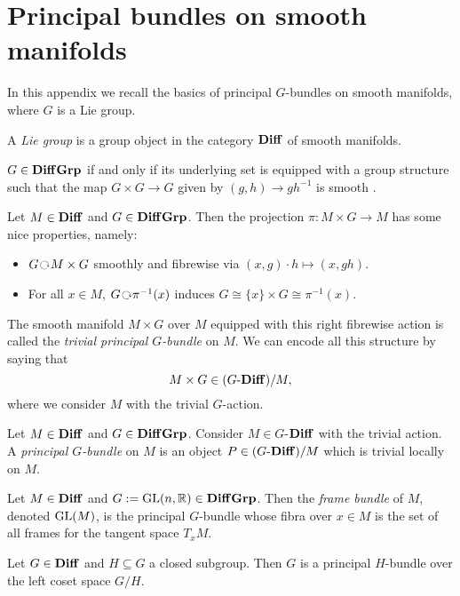 \section{Principal bundles on smooth manifolds}

In this appendix we recall the basics of principal $G$-bundles on smooth manifolds, where $G$ is a Lie group.

\begin{defn}
    A \textit{Lie group} is a group object in the category $\mathbf{Diff}$ of smooth manifolds.
\end{defn}

\begin{rem}
    $G\in \mathbf{Diff}\mathbf{Grp}$ if and only if its underlying set is equipped with a group structure such that the map $G\times G\to G$ given by $(g,h)\to gh^{-1}$ is smooth \cite[Proposition 7.1]{lee13}.
\end{rem}

Let $M\in \mathbf{Diff}$ and $G\in \mathbf{Diff}\mathbf{Grp}$.
Then the projection $\pi\colon M\times G\to M$ has some nice properties, namely:
\begin{itemize}
    \item $G\act M\times G$ smoothly and fibrewise via $(x,g)\cdot h\mapsto (x,gh)$.
    \item For all $x\in M$, $G\act \pi^{-1}(x)$ induces $G\cong \{x\}\times G\cong \pi^{-1}(x)$.
\end{itemize}
The smooth manifold $M\times G$ over $M$ equipped with this right fibrewise action is called the \textit{trivial principal $G$-bundle} on $M$.
We can encode all this structure by saying that
\[ M\times G \in (G\text{-}\mathbf{Diff})/M, \]
where we consider $M$ with the trivial $G$-action.

\begin{defn}
    Let $M\in \mathbf{Diff}$ and $G\in \mathbf{Diff}\mathbf{Grp}$.
    Consider $M\in G$-$\mathbf{Diff}$ with the trivial action.
    A \textit{principal $G$-bundle} on $M$ is an object $P\in (G\text{-}\mathbf{Diff})/M$ which is trivial locally on $M$.
\end{defn}

\begin{exa}
    Let $M\in \mathbf{Diff}$ and $G:=\operatorname{GL}(n,\mathbb{R})\in \mathbf{Diff}\mathbf{Grp}$.
    Then the \textit{frame bundle} of $M$, denoted $\operatorname{GL}(M)$, is the principal $G$-bundle whose fibra over $x\in M$ is the set of all frames for the tangent space $T_{x}M$.
\end{exa}

\begin{exa}
    Let $G\in \mathbf{Diff}$ and $H\subseteq G$ a closed subgroup.
    Then $G$ is a principal $H$-bundle over the left coset space $G/H$.
\end{exa}

